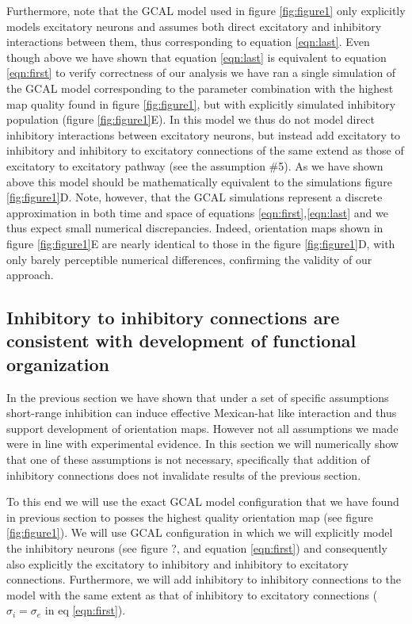 \documentclass[a4paper,10pt]{article}
\begin{document}
Furthermore, note that the GCAL model used in figure \ref{fig:figure1} only explicitly models excitatory neurons and assumes both direct excitatory and inhibitory
interactions between them, thus corresponding to equation \ref{eqn:last}. Even though above we have shown that equation \ref{eqn:last} is equivalent to equation \ref{eqn:first} to verify 
correctness of our analysis we have ran a single simulation of the GCAL model corresponding to the parameter combination with the highest map 
quality found in figure \ref{fig:figure1}, but with explicitly simulated inhibitory population (figure \ref{fig:figure1}E). In this model we thus do not model direct inhibitory 
interactions between excitatory neurons, but instead add excitatory to inhibitory and inhibitory to excitatory connections of the same extend as those of excitatory to excitatory pathway (see the assumption \#5). 
As we have shown above this model should be mathematically equivalent to the simulations figure \ref{fig:figure1}D. Note, however, that the GCAL simulations represent a discrete approximation 
in both time and space of equations \ref{eqn:first},\ref{eqn:last} and we thus expect small numerical discrepancies. Indeed, orientation maps shown in figure \ref{fig:figure1}E  are nearly identical to those 
in the figure \ref{fig:figure1}D, with only barely perceptible numerical differences, confirming the validity of our approach.


\subsection{Inhibitory to inhibitory connections are consistent with development of functional organization} \label{sec:SM2}

In the previous section we have shown that under a set of specific assumptions short-range inhibition can induce 
effective Mexican-hat like interaction and thus support development of orientation maps. However not all assumptions we 
made were in line with experimental evidence. In this section we will numerically show that one of these assumptions is not necessary, 
specifically that addition of inhibitory connections does not invalidate results of the previous section. 

To this end we will use the exact GCAL model configuration that we have found in previous section to posses the highest
quality orientation map (see figure \ref{fig:figure1}). We will use GCAL configuration in which we will explicitly model the inhibitory neurons
(see figure ?, and equation \ref{eqn:first}) and consequently also explicitly the excitatory to inhibitory and inhibitory to excitatory connections.
Furthermore, we will add inhibitory to inhibitory connections to the model with the same extent as that of inhibitory to excitatory
connections ($\sigma_{i} = \sigma_{e}$ in eq \ref{eqn:first}). 
\end{document}
